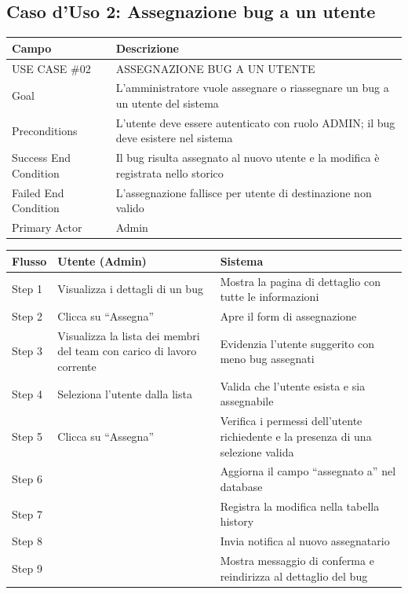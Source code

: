 ﻿\documentclass[a4paper,11pt]{article}
\begin{document}
\subsection{Caso d'Uso 2: Assegnazione bug a un utente}

\begin{tabular}{|p{3cm}|p{11cm}|}
\hline
\textbf{Campo} & \textbf{Descrizione} \\
\hline
USE CASE \#02 & ASSEGNAZIONE BUG A UN UTENTE \\
\hline
Goal & L'amministratore vuole assegnare o riassegnare un bug a un utente del sistema \\
\hline
Preconditions & L'utente deve essere autenticato con ruolo ADMIN; il bug deve esistere nel sistema \\
\hline
Success End Condition & Il bug risulta assegnato al nuovo utente e la modifica \`e registrata nello storico \\
\hline
Failed End Condition & L'assegnazione fallisce per utente di destinazione non valido \\
\hline
Primary Actor & Admin \\
\hline
\end{tabular}

\vspace{0.5cm}

\begin{tabular}{|p{2cm}|p{5.5cm}|p{6.5cm}|}
\hline
\textbf{Flusso} & \textbf{Utente (Admin)} & \textbf{Sistema} \\
\hline
Step 1 & Visualizza i dettagli di un bug & Mostra la pagina di dettaglio con tutte le informazioni \\
\hline
Step 2 & Clicca su ``Assegna'' & Apre il form di assegnazione \\
\hline
Step 3 & Visualizza la lista dei membri del team con carico di lavoro corrente & Evidenzia l'utente suggerito con meno bug assegnati \\
\hline
Step 4 & Seleziona l'utente dalla lista & Valida che l'utente esista e sia assegnabile \\
\hline
Step 5 & Clicca su ``Assegna'' & Verifica i permessi dell'utente richiedente e la presenza di una selezione valida \\
\hline
Step 6 & & Aggiorna il campo ``assegnato a'' nel database \\
\hline
Step 7 & & Registra la modifica nella tabella history \\
\hline
Step 8 & & Invia notifica al nuovo assegnatario \\
\hline
Step 9 & & Mostra messaggio di conferma e reindirizza al dettaglio del bug \\
\hline
\end{tabular}
\end{document}
